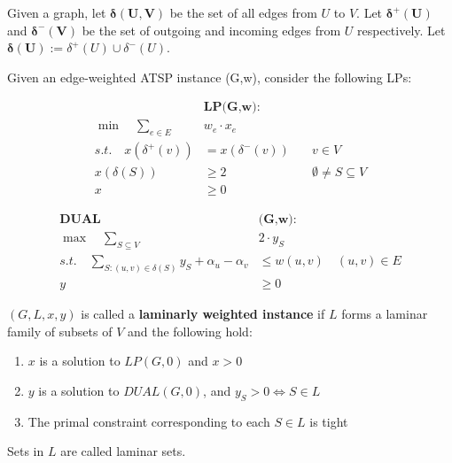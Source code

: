 \documentclass[./main.tex]{subfiles}
\begin{document}
\begin{definition} Given a graph, let $\bm{\delta(U,V)}$ be the set of all edges from $U$ to $V$. Let $\bm{\delta^+(U)}$ and $\bm{\delta^-(V)}$ be the set of outgoing and incoming edges from $U$ respectively. Let $\bm{\delta(U)}:=\delta^+(U)\cup \delta^-(U)$.\end{definition}\vspace{4mm}
\begin{definition} Given an edge-weighted ATSP instance (G,w), consider the following LPs:
\end{definition}
\begin{minipage}{0.20\textwidth}
	\begin{align*}
		&\textbf{LP(G,w):}\\
		\min\quad\sum_{e\in E}&w_e\cdot x_e\\
		s.t.\quad x(\delta^+(v)) & = x(\delta^-(v))\quad & v\in V                     \\
		x(\delta(S))             & \geq 2\quad           & \emptyset\neq S\subseteq V \\
		x&\geq 0
	\end{align*}
\end{minipage}
\hfill\vline\hfill
\begin{minipage}{0.55\textwidth}
	\begin{align*}
		\textbf{DUAL}                                                 & \textbf{(G,w):}             \\
		\max\quad\sum_{S\subseteq V}                                  & 2\cdot y_S                  \\
		s.t.\quad\sum_{S:(u,v)\in \delta(S)}y_S + \alpha_u - \alpha_v & \leq w(u,v)\quad (u,v)\in E \\
		y                                                             & \geq 0
	\end{align*}
\end{minipage}
\vspace{7mm}
\begin{definition} $(G,L,x,y)$ is called a \textbf{laminarly weighted instance} if $L$ forms a laminar family of subsets of $V$ and the following hold:
	\begin{enumerate}
		\item $x$ is a solution to $LP(G,0)$ and $x > 0$
		\item $y$ is a solution to $DUAL(G,0)$, and $y_S>0\iff S\in L$
		\item The primal constraint corresponding to each $S\in L$ is tight
	\end{enumerate}
	Sets in $L$ are called laminar sets.
\end{definition}\vspace{4mm}
\end{document}
